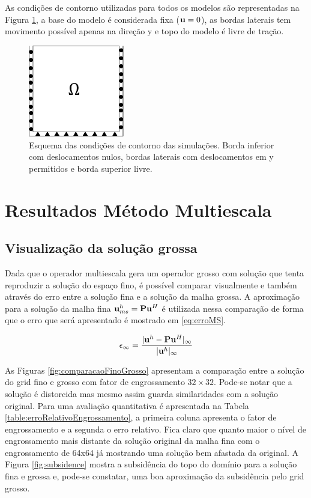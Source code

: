 As condições de contorno utilizadas para todos os modelos são representadas na Figura \ref{fig:CondicoesContorno}, a base do modelo é considerada fixa ($\mathbf{u}=0$), as bordas laterais tem movimento possível apenas na direção y e topo do modelo é livre de tração.

\begin{figure}[!htbp]
    \centering
    \includegraphics[height=4cm]{chap08/figs/CondicoesContorno.png}
    \caption{Esquema das condições de contorno das simulações. Borda inferior com deslocamentos nulos, bordas laterais com deslocamentos em y permitidos e borda superior livre.}
    \label{fig:CondicoesContorno}
\end{figure}


\section{Resultados Método Multiescala}

\subsection{Visualização da solução grossa}

Dada que o operador multiescala gera um operador grosso com solução que tenta reproduzir a solução do espaço fino, é possível comparar visualmente e também através do erro entre a solução fina e a solução da malha grossa. A aproximação para a solução da malha fina $\mathbf{u}^h_{ms} = \mathbf{P} \mathbf{u}^H$ é utilizada nessa comparação de forma que o erro que será apresentado é mostrado em \eqref{eq:erroMS}.

\begin{equation}\label{eq:erroMS}
\epsilon_{\infty} =\frac{|\mathbf{u}^h - \mathbf{P} \mathbf{u}^H|_{\infty}}{|\mathbf{u}^h|_{\infty}}
\end{equation}


As Figuras \ref{fig:comparacaoFinoGrosso} apresentam a comparação entre a solução do grid fino e grosso com fator de engrossamento $32\times32$. Pode-se notar que a solução é distorcida mas mesmo assim guarda similaridades com a solução original. Para uma avaliação quantitativa é apresentada na Tabela \ref{table:erroRelativoEngrossamento}, a primeira coluna apresenta o fator de engrossamento e a segunda o erro relativo. Fica claro que quanto maior o nível de engrossamento mais distante da solução original da malha fina com o engrossamento de 64x64 já mostrando uma solução bem afastada da original. 
A Figura \ref{fig:subsidence} mostra a subsidência do topo do domínio para a solução fina e grossa e, pode-se constatar, uma boa aproximação da subsidência pelo grid grosso.


